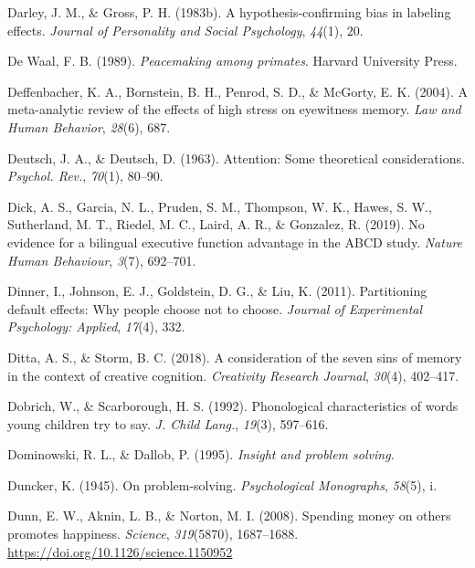 \documentclass[
]{krantz}
\newlength{\cslhangindent}
\newenvironment{CSLReferences}[2] %
 {\begin{list}{}{%
  \setlength{\itemindent}{0pt}
  \setlength{\leftmargin}{0pt}
  \setlength{\parsep}{0pt}
  \ifodd #1
   \setlength{\leftmargin}{\cslhangindent}
   \setlength{\itemindent}{-1\cslhangindent}
  \fi
  \setlength{\itemsep}{#2\baselineskip}}}
 {\end{list}}
\begin{document}
\begin{CSLReferences}{1}{0}
Darley, J. M., \& Gross, P. H. (1983b). A hypothesis-confirming bias in labeling effects. \emph{Journal of Personality and Social Psychology}, \emph{44}(1), 20.

De Waal, F. B. (1989). \emph{Peacemaking among primates}. Harvard University Press.

Deffenbacher, K. A., Bornstein, B. H., Penrod, S. D., \& McGorty, E. K. (2004). A meta-analytic review of the effects of high stress on eyewitness memory. \emph{Law and Human Behavior}, \emph{28}(6), 687.

Deutsch, J. A., \& Deutsch, D. (1963). Attention: Some theoretical considerations. \emph{Psychol. Rev.}, \emph{70}(1), 80--90.

Dick, A. S., Garcia, N. L., Pruden, S. M., Thompson, W. K., Hawes, S. W., Sutherland, M. T., Riedel, M. C., Laird, A. R., \& Gonzalez, R. (2019). No evidence for a bilingual executive function advantage in the ABCD study. \emph{Nature Human Behaviour}, \emph{3}(7), 692--701.

Dinner, I., Johnson, E. J., Goldstein, D. G., \& Liu, K. (2011). Partitioning default effects: Why people choose not to choose. \emph{Journal of Experimental Psychology: Applied}, \emph{17}(4), 332.

Ditta, A. S., \& Storm, B. C. (2018). A consideration of the seven sins of memory in the context of creative cognition. \emph{Creativity Research Journal}, \emph{30}(4), 402--417.

Dobrich, W., \& Scarborough, H. S. (1992). Phonological characteristics of words young children try to say. \emph{J. Child Lang.}, \emph{19}(3), 597--616.

Dominowski, R. L., \& Dallob, P. (1995). \emph{Insight and problem solving.}

Duncker, K. (1945). On problem-solving. \emph{Psychological Monographs}, \emph{58}(5), i.

Dunn, E. W., Aknin, L. B., \& Norton, M. I. (2008). Spending money on others promotes happiness. \emph{Science}, \emph{319}(5870), 1687--1688. \url{https://doi.org/10.1126/science.1150952}


\end{CSLReferences}
\end{document}
